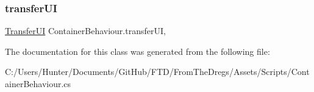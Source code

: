 \subsubsection{\texorpdfstring{transferUI}{transferUI}}
{\footnotesize\ttfamily \mbox{\hyperlink{class_transfer_u_i}{Transfer\+UI}} Container\+Behaviour.\+transfer\+UI\hspace{0.3cm}{\ttfamily [get]}, {\ttfamily [set]}}



The documentation for this class was generated from the following file\+:\begin{DoxyCompactItemize}
\item 
C\+:/\+Users/\+Hunter/\+Documents/\+Git\+Hub/\+F\+T\+D/\+From\+The\+Dregs/\+Assets/\+Scripts/Container\+Behaviour.\+cs\end{DoxyCompactItemize}
